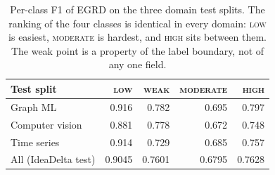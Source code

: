 \begin{table}[t]
\centering
\footnotesize
\setlength{\tabcolsep}{6pt}
\renewcommand{\arraystretch}{1.05}
\caption{Per-class F1 of EGRD on the three domain test splits. The ranking of the
four classes is identical in every domain: \textsc{low} is easiest,
\textsc{moderate} is hardest, and \textsc{high} sits between them. The weak point
is a property of the label boundary, not of any one field.}
\label{tab:panel-c-class}
\begin{tabular}{@{}lrrrr@{}}
\toprule
Test split & \textsc{low} & \textsc{weak} & \textsc{moderate} & \textsc{high} \\
\midrule
Graph ML & 0.916 & 0.782 & 0.695 & 0.797 \\
Computer vision & 0.881 & 0.778 & 0.672 & 0.748 \\
Time series & 0.914 & 0.729 & 0.685 & 0.757 \\
\addlinespace
All (IdeaDelta test) & 0.9045 & 0.7601 & 0.6795 & 0.7628 \\
\bottomrule
\end{tabular}
\end{table}


